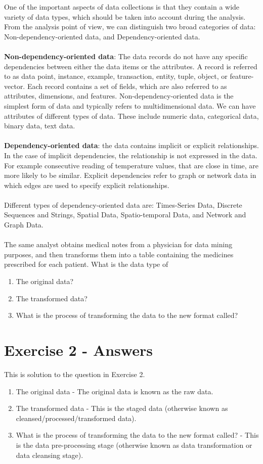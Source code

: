 \documentclass{scrreprt}
\begin{document}
One of the important aspects of data collections is that they contain a wide variety of data types, which should be taken into account during the analysis. From the analysis point of view, we can distinguish two broad categories of data: Non-dependency-oriented data, and Dependency-oriented data.
\\
\\
\textbf{Non-dependency-oriented data}: The data records do not have any specific dependencies between either the data items or the attributes. A record is referred to as data point, instance, example, transaction, entity, tuple, object, or feature- vector. Each record contains a set of fields, which are also referred to as attributes, dimensions, and features. Non-dependency-oriented data is the simplest form of data and typically refers to multidimensional data.
We can have attributes of different types of data. These include numeric data, categorical data, binary data, text data.
\\
\\
\textbf{Dependency-oriented data}: the data contains implicit or explicit relationships. In the case of implicit dependencies, the relationship is not expressed in the data. For example consecutive reading of temperature values, that are close in time, are more likely to be similar. Explicit dependencies refer to graph or network data in which edges are used to specify explicit relationships.
\\
\\
Different types of dependency-oriented data are: Times-Series Data, Discrete Sequences and Strings, Spatial Data, Spatio-temporal Data, and Network and Graph Data.
\\
\\
The same analyst obtains medical notes from a physician for data mining purposes, and then transforms them into a table containing the medicines prescribed for each patient. What is the data type of
\begin{enumerate}
\item The original data?
\item The transformed data?
\item What is the process of transforming the data to the new format called?
\end{enumerate}


\section{Exercise 2 - Answers}
This is solution to the question in Exercise 2. 
\begin{enumerate}
	\item The original data - The original data is known as the raw data.
	\item The transformed data - This is the staged data (otherwise known as cleansed/processed/transformed data).
	\item What is the process of transforming the data to the new format called? - This is the data pre-processing stage (otherwise known as data transformation or data cleansing stage).
\end{enumerate}
\end{document}
